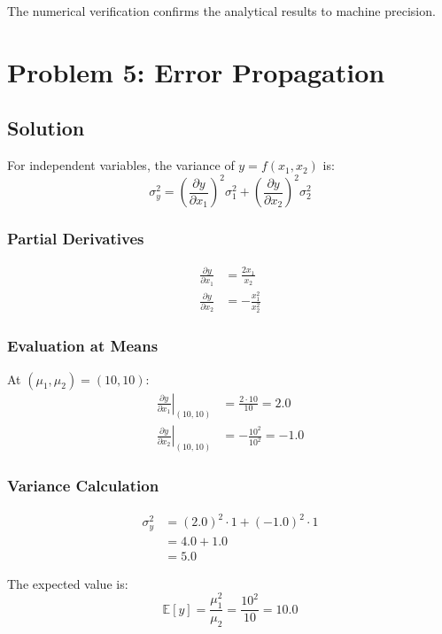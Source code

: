\documentclass[12pt]{article}
\begin{document}
The numerical verification confirms the analytical results to machine precision.

\section{Problem 5: Error Propagation}
\label{sec:problem5}

\subsection*{Solution}
For independent variables, the variance of $y = f(x_1, x_2)$ is:
\begin{equation}
\sigma_y^2 = \left( \frac{\partial y}{\partial x_1} \right)^2 \sigma_1^2 + \left( \frac{\partial y}{\partial x_2} \right)^2 \sigma_2^2
\end{equation}

\subsubsection*{Partial Derivatives}
\begin{align}
\frac{\partial y}{\partial x_1} &= \frac{2x_1}{x_2} \\
\frac{\partial y}{\partial x_2} &= -\frac{x_1^2}{x_2^2}
\end{align}

\subsubsection*{Evaluation at Means}
At $(\mu_1, \mu_2) = (10, 10)$:
\begin{align}
\left. \frac{\partial y}{\partial x_1} \right|_{(10,10)} &= \frac{2 \cdot 10}{10} = 2.0 \\
\left. \frac{\partial y}{\partial x_2} \right|_{(10,10)} &= -\frac{10^2}{10^2} = -1.0
\end{align}

\subsubsection*{Variance Calculation}
\begin{align}
\sigma_y^2 &= (2.0)^2 \cdot 1 + (-1.0)^2 \cdot 1 \\
&= 4.0 + 1.0 \\
&= 5.0
\end{align}

The expected value is:
\begin{equation}
\mathbb{E}[y] = \frac{\mu_1^2}{\mu_2} = \frac{10^2}{10} = 10.0
\end{equation}
\end{document}

